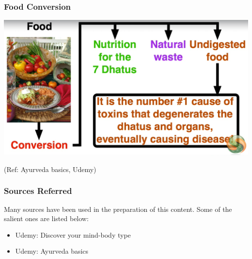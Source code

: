 \begin{frame}[fragile]\frametitle{Food Conversion}


\begin{center}
\includegraphics[width=0.7\linewidth,keepaspectratio]{images/ayur5}
\end{center}

{\tiny (Ref: Ayurveda basics, Udemy)}

\end{frame}


\begin{frame}[fragile]\frametitle{Sources Referred}

Many sources have been used in the preparation of this content. Some of the salient ones are listed below:

	\begin{itemize}
	\item Udemy: Discover your mind-body type
	\item Udemy: Ayurveda basics	
	\end{itemize}

\end{frame}



	





